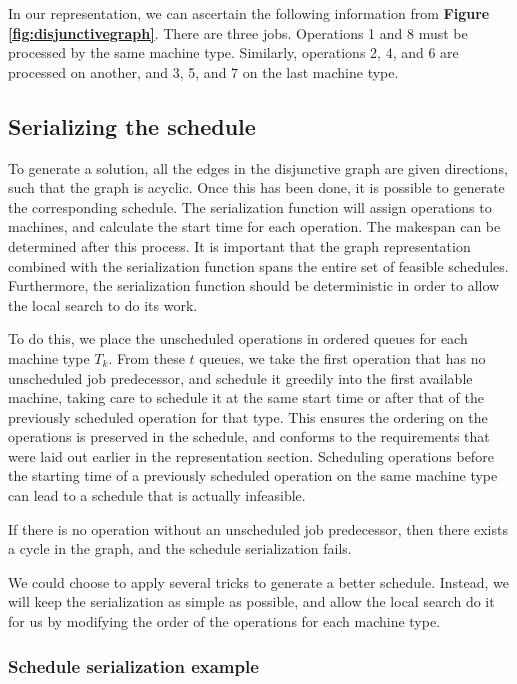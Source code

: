 \documentclass[a4paper,11pt]{article}
\begin{document}
In our representation, we can ascertain the following information from \textbf{Figure \ref{fig:disjunctivegraph}}. There are three jobs. Operations 1 and 8 must be processed by the same machine type. Similarly, operations 2, 4, and 6 are processed on another, and 3, 5, and 7 on the last machine type.

\subsection{Serializing the schedule}

To generate a solution, all the edges in the disjunctive graph are given directions, such that the graph is acyclic. Once this has been done, it is possible to generate the corresponding schedule. The serialization function will assign operations to machines, and calculate the start time for each operation. The makespan can be determined after this process. It is important that the graph representation combined with the serialization function spans the entire set of feasible schedules. Furthermore, the serialization function should be deterministic in order to allow the local search to do its work.

To do this, we place the unscheduled operations in ordered queues for each machine type $T_k$. From these $t$ queues, we take the first operation that has no unscheduled job predecessor, and schedule it greedily into the first available machine, taking care to schedule it at the same start time or after that of the previously scheduled operation for that type. This ensures the ordering on the operations is preserved in the schedule, and conforms to the requirements that were laid out earlier in the representation section. Scheduling operations before the starting time of a previously scheduled operation on the same machine type can lead to a schedule that is actually infeasible.

If there is no operation without an unscheduled job predecessor, then there exists a cycle in the graph, and the schedule serialization fails.

We could choose to apply several tricks to generate a better schedule. Instead, we will keep the serialization as simple as possible, and allow the local search do it for us by modifying the order of the operations for each machine type.

\subsubsection{Schedule serialization example}
\end{document}
